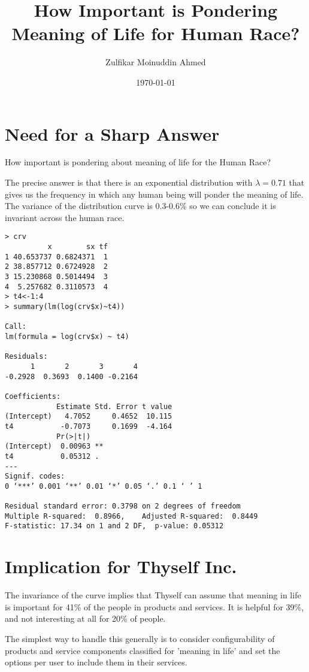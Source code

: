 \documentclass{amsart}
\title{How Important is Pondering Meaning of Life for Human Race?}
\author{Zulfikar Moinuddin Ahmed}
\date{\today}
\begin{document}
\maketitle
\section{Need for a Sharp Answer}

How important is pondering about meaning of life for the Human Race?

The precise answer is that there is an exponential distribution with $\lambda=0.71$ that gives us the frequency in which any human being will ponder the meaning of life.  The variance of the distribution curve is 0.3-0.6\% so we can conclude it is invariant across the human race.

\begin{verbatim}
> crv
          x        sx tf
1 40.653737 0.6824371  1
2 38.857712 0.6724928  2
3 15.230868 0.5014494  3
4  5.257682 0.3110573  4
> t4<-1:4
> summary(lm(log(crv$x)~t4))

Call:
lm(formula = log(crv$x) ~ t4)

Residuals:
      1       2       3       4 
-0.2928  0.3693  0.1400 -0.2164 

Coefficients:
            Estimate Std. Error t value
(Intercept)   4.7052     0.4652  10.115
t4           -0.7073     0.1699  -4.164
            Pr(>|t|)   
(Intercept)  0.00963 **
t4           0.05312 . 
---
Signif. codes:  
0 ‘***’ 0.001 ‘**’ 0.01 ‘*’ 0.05 ‘.’ 0.1 ‘ ’ 1

Residual standard error: 0.3798 on 2 degrees of freedom
Multiple R-squared:  0.8966,	Adjusted R-squared:  0.8449 
F-statistic: 17.34 on 1 and 2 DF,  p-value: 0.05312
\end{verbatim}

\section{Implication for Thyself Inc.}

The invariance of the curve implies that Thyself can assume that meaning in life is important for 41\% of the people in products and services.  It is helpful for 39\%, and not interesting at all for 20\% of people.

The simplest way to handle this generally is to consider configurability of products and service components classified for 'meaning in life' and set the options per user to include them in their services.
 
\end{document}
